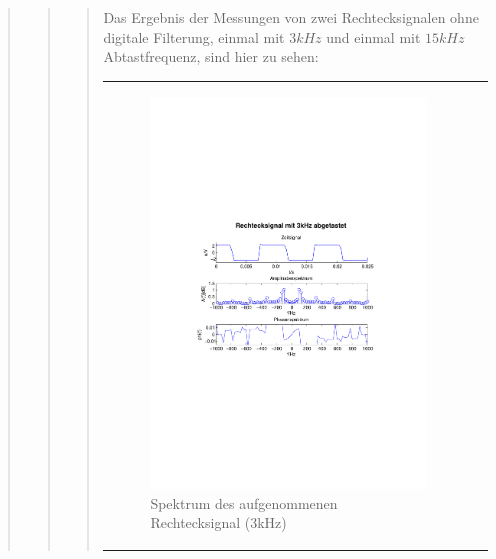 \begin{quote}
\begin{quote}
\begin{quote}
    	Das Ergebnis der Messungen von zwei Rechtecksignalen ohne digitale
    	Filterung, einmal mit $3kHz$ und einmal mit $15kHz$ Abtastfrequenz, sind
    	hier zu sehen:
    	
    	 \begin{center}
                \begin{tabular}{ll}
    
                \hspace{-12em}
                    \begin{minipage}{0.6\textwidth}
    
                        \begin{figure}[H]
                            \label{fig:}
                            \includegraphics[scale=0.65, trim = 3cm 9cm 3cm
                            8.5cm, clip]{./Bilder/6_2_rechteck_3kHz}
                            \caption{Spektrum des aufgenommenen Rechtecksignal
                            (3kHz)}
                        \end{figure}
    

\end{minipage}
\end{tabular}
\end{center}
\end{quote}
\end{quote}
\end{quote}
